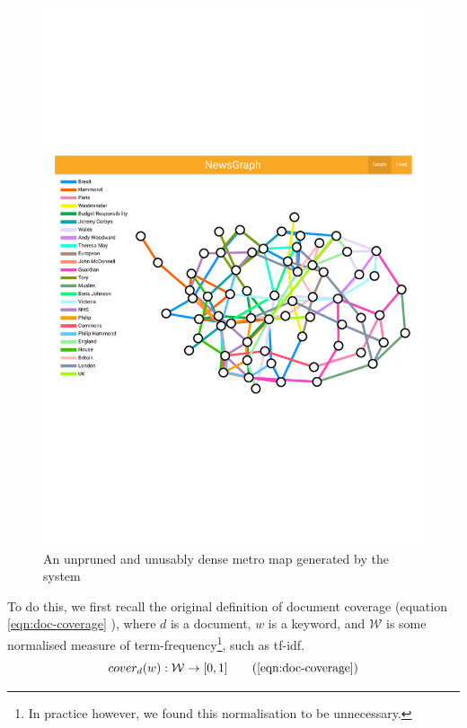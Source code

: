 \begin{figure}[htbp!]
	\centering
	\includegraphics[width=\textwidth]{img/implementation/datascienceishard.pdf}
	\caption{An unpruned and unusably dense metro map generated by the system}
	\label{fig:dense}
\end{figure}

To do this, we first recall the original definition of document coverage (equation \ref{eqn:doc-coverage} \citep{GeneratingInformationMaps, MetroMapsOfScience, InformationCartographyPre}), where $d$ is a document, $w$ is a keyword, and $\mathcal{W}$ is some normalised measure of term-frequency\footnote{In practice however, we found this normalisation to be unnecessary.
}, such as tf-idf.
\begin{equation}
	cover_{d}(w) : \mathcal{W} \rightarrow [0,1]
	\tag{\ref{eqn:doc-coverage}}
\end{equation}

